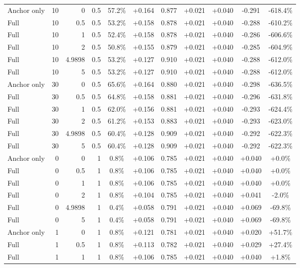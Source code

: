 \begin{table}[htbp]
\begin{tabular}{lrrrccccccc}
Anchor only & 10 & 0 & 0.5 & 57.2\% & +0.164 & 0.877 & +0.021 & +0.040 & -0.291 & -618.4\% \\
Full & 10 & 0.5 & 0.5 & 53.2\% & +0.158 & 0.878 & +0.021 & +0.040 & -0.288 & -610.2\% \\
Full & 10 & 1 & 0.5 & 52.4\% & +0.158 & 0.878 & +0.021 & +0.040 & -0.286 & -606.6\% \\
Full & 10 & 2 & 0.5 & 50.8\% & +0.155 & 0.879 & +0.021 & +0.040 & -0.285 & -604.9\% \\
Full & 10 & 4.9898 & 0.5 & 53.2\% & +0.127 & 0.910 & +0.021 & +0.040 & -0.288 & -612.0\% \\
Full & 10 & 5 & 0.5 & 53.2\% & +0.127 & 0.910 & +0.021 & +0.040 & -0.288 & -612.0\% \\
Anchor only & 30 & 0 & 0.5 & 65.6\% & +0.164 & 0.880 & +0.021 & +0.040 & -0.298 & -636.5\% \\
Full & 30 & 0.5 & 0.5 & 64.8\% & +0.158 & 0.881 & +0.021 & +0.040 & -0.296 & -631.8\% \\
Full & 30 & 1 & 0.5 & 62.0\% & +0.156 & 0.881 & +0.021 & +0.040 & -0.293 & -624.4\% \\
Full & 30 & 2 & 0.5 & 61.2\% & +0.153 & 0.883 & +0.021 & +0.040 & -0.293 & -623.0\% \\
Full & 30 & 4.9898 & 0.5 & 60.4\% & +0.128 & 0.909 & +0.021 & +0.040 & -0.292 & -622.3\% \\
Full & 30 & 5 & 0.5 & 60.4\% & +0.128 & 0.909 & +0.021 & +0.040 & -0.292 & -622.3\% \\
Anchor only & 0 & 0 & 1 & 0.8\% & +0.106 & 0.785 & +0.021 & +0.040 & +0.040 & +0.0\% \\
Full & 0 & 0.5 & 1 & 0.8\% & +0.106 & 0.785 & +0.021 & +0.040 & +0.040 & +0.0\% \\
Full & 0 & 1 & 1 & 0.8\% & +0.106 & 0.785 & +0.021 & +0.040 & +0.040 & +0.0\% \\
Full & 0 & 2 & 1 & 0.8\% & +0.104 & 0.785 & +0.021 & +0.040 & +0.041 & -2.0\% \\
Full & 0 & 4.9898 & 1 & 0.4\% & +0.058 & 0.791 & +0.021 & +0.040 & +0.069 & -69.8\% \\
Full & 0 & 5 & 1 & 0.4\% & +0.058 & 0.791 & +0.021 & +0.040 & +0.069 & -69.8\% \\
Anchor only & 1 & 0 & 1 & 0.8\% & +0.121 & 0.781 & +0.021 & +0.040 & +0.020 & +51.7\% \\
Full & 1 & 0.5 & 1 & 0.8\% & +0.113 & 0.782 & +0.021 & +0.040 & +0.029 & +27.4\% \\
Full & 1 & 1 & 1 & 0.8\% & +0.106 & 0.785 & +0.021 & +0.040 & +0.040 & +1.8\% \\

\end{tabular}
\end{table}
